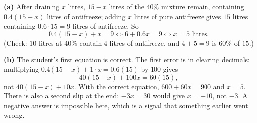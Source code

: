 \textbf{(a)} After draining $x$ litres, $15-x$ litres of the $40\%$ mixture remain, containing $0.4(15-x)$ litres of antifreeze; adding $x$ litres of pure antifreeze gives $15$ litres containing $0.6\cdot15=9$ litres of antifreeze. So
\[0.4(15-x)+x=9\iff6+0.6x=9\iff x=\boxed{5}\text{ litres}.\]
(Check: $10$ litres at $40\%$ contain $4$ litres of antifreeze, and $4+5=9$ is $60\%$ of $15$.)

\textbf{(b)} The student's first equation is correct. The first error is in clearing decimals: multiplying $0.4(15-x)+1\cdot x=0.6(15)$ by $100$ gives
\[40(15-x)+100x=60(15),\]
not $40(15-x)+10x$. With the correct equation, $600+60x=900$ and $x=5$. There is also a second slip at the end: $-3x=30$ would give $x=-10$, not $-3$. A negative answer is impossible here, which is a signal that something earlier went wrong.
